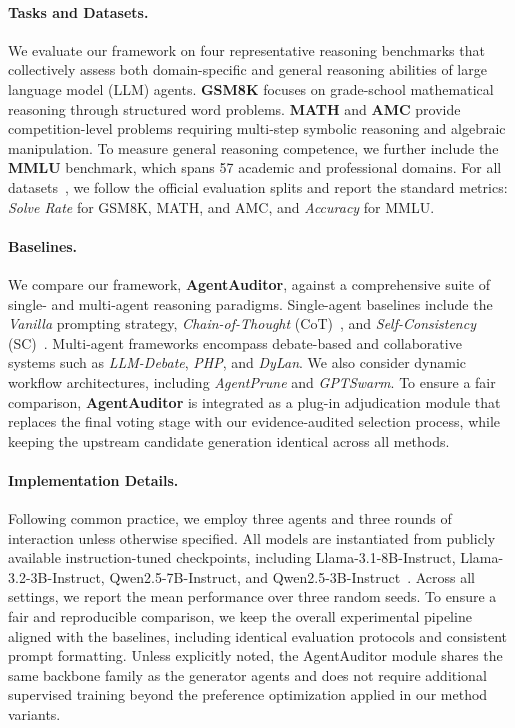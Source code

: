 \documentclass{article}
\theoremstyle{plain}
\theoremstyle{definition}
\theoremstyle{remark}
\begin{document}
\paragraph{Tasks and Datasets.}
We evaluate our framework on four representative reasoning benchmarks that collectively assess both domain-specific and general reasoning abilities of large language model (LLM) agents.
\textbf{GSM8K} focuses on grade-school mathematical reasoning through structured word problems.
\textbf{MATH} and \textbf{AMC} provide competition-level problems requiring multi-step symbolic reasoning and algebraic manipulation.
To measure general reasoning competence, we further include the \textbf{MMLU} benchmark, which spans 57 academic and professional domains.
For all datasets~\cite{cobbe2021training,hendrycks2020measuring}, we follow the official evaluation splits and report the standard metrics:
\emph{Solve Rate} for GSM8K, MATH, and AMC, and \emph{Accuracy} for MMLU.

\paragraph{Baselines.}
We compare our framework, \textbf{AgentAuditor}, against a comprehensive suite of single- and multi-agent reasoning paradigms.
Single-agent baselines include the \textit{Vanilla} prompting strategy, \textit{Chain-of-Thought} (CoT)~\cite{wei2022chain}, and \textit{Self-Consistency} (SC)~\cite{wang2022self}.
Multi-agent frameworks encompass debate-based and collaborative systems such as \textit{LLM-Debate}, \textit{PHP}, and \textit{DyLan}.
We also consider dynamic workflow architectures, including \textit{AgentPrune} and \textit{GPTSwarm}.
To ensure a fair comparison, \textbf{AgentAuditor} is integrated as a plug-in adjudication module that replaces the final voting stage with our evidence-audited selection process, while keeping the upstream candidate generation identical across all methods.



\paragraph{Implementation Details.}
Following common practice, we employ three agents and three rounds of interaction unless otherwise specified.
All models are instantiated from publicly available instruction-tuned checkpoints, including
Llama-3.1-8B-Instruct, Llama-3.2-3B-Instruct, Qwen2.5-7B-Instruct, and Qwen2.5-3B-Instruct~\cite{dubey2024llama,bai2023qwen}.
Across all settings, we report the mean performance over three random seeds.
To ensure a fair and reproducible comparison, we keep the overall experimental pipeline aligned with the baselines,
including identical evaluation protocols and consistent prompt formatting.
Unless explicitly noted, the AgentAuditor module shares the same backbone family as the generator agents and does not require
additional supervised training beyond the preference optimization applied in our method variants.
\end{document}
